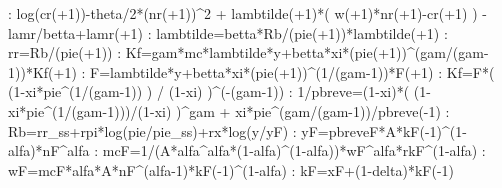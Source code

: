 \documentclass{article}%
\begin{document}
   :  log(cr(+1)){-}theta/2*(nr(+1))\^{}2 + lambtilde(+1)*( w(+1)*nr(+1){-}cr(+1) ) {-} lamr/betta+lamr(+1)\newline%
   :  lambtilde=betta*Rb/(pie(+1))*lambtilde(+1)\newline%
   :  rr=Rb/(pie(+1))\newline%
   :  Kf=gam*mc*lambtilde*y+betta*xi*(pie(+1))\^{}(gam/(gam{-}1))*Kf(+1)\newline%
   :  F=lambtilde*y+betta*xi*(pie(+1))\^{}(1/(gam{-}1))*F(+1)\newline%
   :  Kf=F*( (1{-}xi*pie\^{}(1/(gam{-}1)) ) / (1{-}xi) )\^{}({-}(gam{-}1))\newline%
   :  1/pbreve=(1{-}xi)*( (1{-}xi*pie\^{}(1/(gam{-}1)))/(1{-}xi) )\^{}gam + xi*pie\^{}(gam/(gam{-}1))/pbreve({-}1)\newline%
   :  Rb=rr\_ss+rpi*log(pie/pie\_ss)+rx*log(y/yF)\newline%
   :  yF=pbreveF*A*kF({-}1)\^{}(1{-}alfa)*nF\^{}alfa\newline%
   :  mcF=1/(A*alfa\^{}alfa*(1{-}alfa)\^{}(1{-}alfa))*wF\^{}alfa*rkF\^{}(1{-}alfa)\newline%
   :  wF=mcF*alfa*A*nF\^{}(alfa{-}1)*kF({-}1)\^{}(1{-}alfa)\newline%
   :  kF=xF+(1{-}delta)*kF({-}1)\newline%
\end{document}
